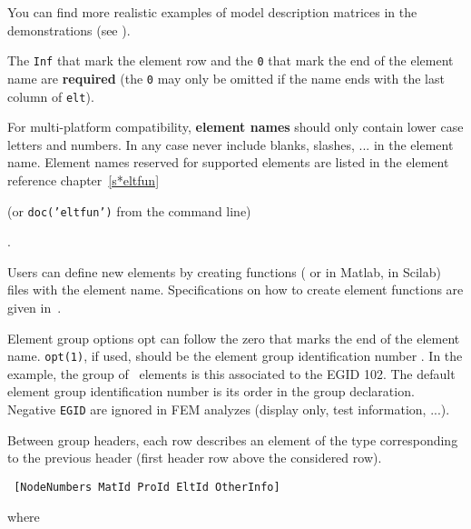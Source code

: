 You can find more realistic examples of model description matrices in the demonstrations (see ).


\lvs\noindent{}


\noindent The {\tt Inf} that mark the element row and the {\tt 0} that mark the end of the element name are {\bf required} (the {\tt 0} may only be omitted if the name ends with the last column of {\tt elt}).

For multi-platform compatibility, {\bf element names} should only contain lower case letters and numbers.  In any case never include blanks, slashes, ... in the element name.  Element names reserved for supported elements are listed in the element reference chapter~\ref{s*eltfun} \begin{SDT} (or {\tt doc('eltfun')} from the command line) \end{SDT}.


Users can define new elements by creating functions ( or  in Matlab,  in Scilab) files with the element name.  Specifications on how to create element functions are given in~. 

\lvs Element group options {\ti opt} can follow the zero that marks the end of the element name. {\tt opt(1)}, if used, should be the element group identification number .  In the example, the group of \mass\ elements is this associated to the {\ti EGID} 102.  
The default element group identification number is its order in the group declaration.  Negative {\tt EGID} are ignored in FEM analyzes (display only, test information, ...).

Between group headers, each row describes an element of the type corresponding to the previous header (first header row above the considered row).

\lvs\noindent{}%

\begin{verbatim}
 [NodeNumbers MatId ProId EltId OtherInfo]
\end{verbatim}

\noindent where

